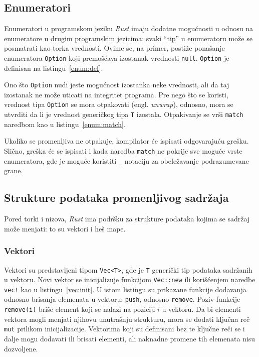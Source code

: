 \documentclass[12pt,oneside]{memoir}
\begin{document}
\subsection{Enumeratori}\label{subsec:enum}
Enumeratori u programskom jeziku \emph{Rust} imaju dodatne mogućnosti u odnosu na enumeratore u
drugim programskim jezicima: svaki ``tip'' u enumeratoru može se posmatrati kao torka vrednosti.
Ovime se, na primer, postiže ponašanje enumeratora \texttt{Option} koji premošćava izostanak vrednosti
\texttt{null}. \texttt{Option} je definisan na listingu~\ref{enum:def}.



Ono što \texttt{Option} nudi jeste mogućnost izostanka neke vrednosti, ali da taj izostanak ne
može uticati na integritet programa. Pre nego što se koristi, vrednost tipa \texttt{Option}
se mora otpakovati (engl. \emph{unwrap}), odnosno, mora se utvrditi da li je vrednost generičkog
tipa \texttt{T} izostala. Otpakivanje se vrši \texttt{match} naredbom kao u
listingu~\ref{enum:match}.



Ukoliko se promenljiva ne otpakuje, kompilator će ispisati odgovarajuću grešku. Slično, greška će
se ispisati i kada naredba \texttt{match} ne pokrije sve moguće vrste enumeratora, gde je moguće
koristiti \texttt{\_} notaciju za obeležavanje podrazumevane grane.

\subsection{Strukture podataka promenljivog sadržaja}
Pored torki i nizova, \emph{Rust} ima podršku za strukture podataka kojima se sadržaj
može menjati: to su vektori i heš mape.

\subsubsection{Vektori}
Vektori su predstavljeni tipom \texttt{Vec<T>}, gde je \texttt{T} generički tip
podataka sadržanih
u vektoru. Novi vektor se inicijalizuje funkcijom \texttt{Vec::new} ili korišćenjem
naredbe \texttt{vec!} kao u listingu~\ref{vec:init}. U istom listingu su prikazane funkcije
dodavanja odnosno brisanja elemenata u vektoru: \texttt{push}, odnosno \texttt{remove}.
Poziv funkcije \texttt{remove(i)} briše element koji se nalazi na poziciji $i$ u vektoru.
Da bi elementi vektora mogli menjati njihovu unutrašnju strukturu, mora se
dodati ključna reč \texttt{mut} prilikom inicijalizacije. Vektorima koji su definisani bez te
ključne reči se i dalje mogu dodavati ili brisati elementi, ali naknadne promene tih
elemenata nisu dozvoljene.
\end{document}
